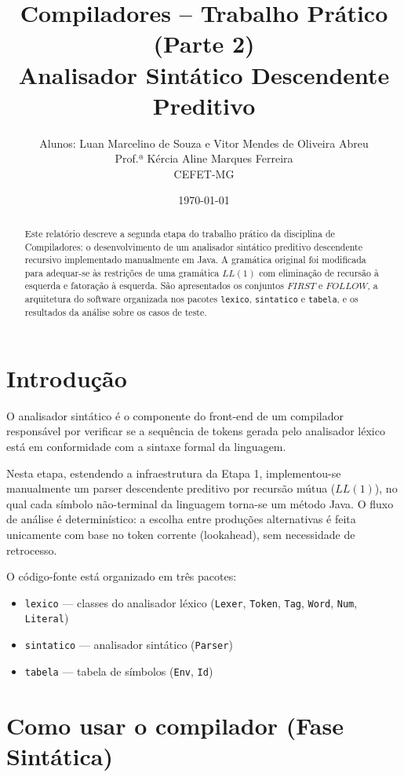 \documentclass[12pt,a4paper]{article}
\title{Compiladores -- Trabalho Prático (Parte 2) \\ Analisador Sintático Descendente Preditivo}
\author{Alunos: Luan Marcelino de Souza e Vitor Mendes de Oliveira Abreu \\ Prof.ª Kércia Aline Marques Ferreira \\ CEFET-MG}
\date{\today}
\begin{document}

\maketitle

\begin{abstract}
Este relatório descreve a segunda etapa do trabalho prático da disciplina de Compiladores: o desenvolvimento de um analisador sintático preditivo descendente recursivo implementado manualmente em Java. A gramática original foi modificada para adequar-se às restrições de uma gramática $LL(1)$ com eliminação de recursão à esquerda e fatoração à esquerda. São apresentados os conjuntos $FIRST$ e $FOLLOW$, a arquitetura do software organizada nos pacotes \texttt{lexico}, \texttt{sintatico} e \texttt{tabela}, e os resultados da análise sobre os casos de teste.
\end{abstract}

\section{Introdução}

O analisador sintático é o componente do front-end de um compilador responsável por verificar se a sequência de tokens gerada pelo analisador léxico está em conformidade com a sintaxe formal da linguagem.

Nesta etapa, estendendo a infraestrutura da Etapa 1, implementou-se manualmente um parser descendente preditivo por recursão mútua ($LL(1)$), no qual cada símbolo não-terminal da linguagem torna-se um método Java. O fluxo de análise é determinístico: a escolha entre produções alternativas é feita unicamente com base no token corrente (lookahead), sem necessidade de retrocesso.

O código-fonte está organizado em três pacotes:
\begin{itemize}
    \item \texttt{lexico} --- classes do analisador léxico (\texttt{Lexer}, \texttt{Token}, \texttt{Tag}, \texttt{Word}, \texttt{Num}, \texttt{Literal})
    \item \texttt{sintatico} --- analisador sintático (\texttt{Parser})
    \item \texttt{tabela} --- tabela de símbolos (\texttt{Env}, \texttt{Id})
\end{itemize}

\section{Como usar o compilador (Fase Sintática)}
\end{document}
